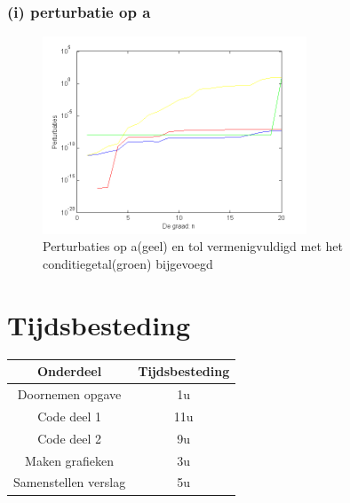 \documentclass[11pt,a4paper]{article}
\begin{document}
\subsubsection*{(i) perturbatie op a}

\begin{figure}[H]
	\centering
	\includegraphics[width=0.7\textwidth]{22i1.png}
	\caption*{Perturbaties op a(geel) en tol vermenigvuldigd met het conditiegetal(groen) bijgevoegd}
	\end{figure}
	
\section{Tijdsbesteding}
\begin{center}
\begin{tabular}{ c || c }
Onderdeel & Tijdsbesteding\\
\hline
\hline
Doornemen opgave & 1u\\
\hline
Code deel 1 & 11u\\
\hline
Code deel 2 & 9u\\
\hline
Maken grafieken & 3u\\
\hline
Samenstellen verslag & 5u
\end{tabular}
\end{center}
\end{document}
